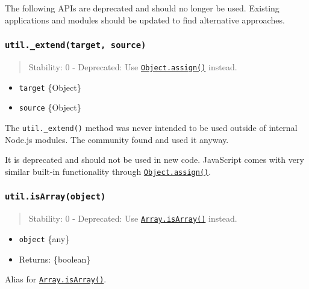The following APIs are deprecated and should no longer be used. Existing
applications and modules should be updated to find alternative
approaches.

\subsubsection{\texorpdfstring{\texttt{util.\_extend(target,\ source)}}{util.\_extend(target, source)}}\label{util._extendtarget-source}

\begin{quote}
Stability: 0 - Deprecated: Use
\href{https://developer.mozilla.org/en-US/docs/Web/JavaScript/Reference/Global_Objects/Object/assign}{\texttt{Object.assign()}}
instead.
\end{quote}

\begin{itemize}
\tightlist
\item
  \texttt{target} \{Object\}
\item
  \texttt{source} \{Object\}
\end{itemize}

The \texttt{util.\_extend()} method was never intended to be used
outside of internal Node.js modules. The community found and used it
anyway.

It is deprecated and should not be used in new code. JavaScript comes
with very similar built-in functionality through
\href{https://developer.mozilla.org/en-US/docs/Web/JavaScript/Reference/Global_Objects/Object/assign}{\texttt{Object.assign()}}.

\subsubsection{\texorpdfstring{\texttt{util.isArray(object)}}{util.isArray(object)}}\label{util.isarrayobject}

\begin{quote}
Stability: 0 - Deprecated: Use
\href{https://developer.mozilla.org/en-US/docs/Web/JavaScript/Reference/Global_Objects/Array/isArray}{\texttt{Array.isArray()}}
instead.
\end{quote}

\begin{itemize}
\tightlist
\item
  \texttt{object} \{any\}
\item
  Returns: \{boolean\}
\end{itemize}

Alias for
\href{https://developer.mozilla.org/en-US/docs/Web/JavaScript/Reference/Global_Objects/Array/isArray}{\texttt{Array.isArray()}}.

